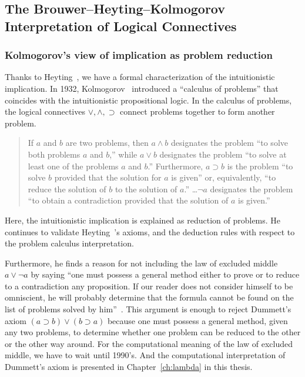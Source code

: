 \subsection{The Brouwer--Heyting--Kolmogorov Interpretation of Logical Connectives}

\subsubsection{Kolmogorov's view of implication as problem reduction}

Thanks to Heyting~\cite{heyting1930}, we have a formal
characterization of the intuitionistic implication.
In 1932, Kolmogorov~\cite{kolmogorov1932} introduced a ``calculus of problems''
that coincides with the intuitionistic propositional logic.
In the calculus of problems, the logical connectives $\vee, \wedge,
\supset$ connect problems together to form another problem.
 \begin{quote}
  If $a$ and $b$ are two problems, then $a\land b$ designates the
  problem ``to solve both problems $a$ and $b$,'' while $a\lor b$
  designates the problem ``to solve at least one of the problems $a$ and
  $b$.''  Furthermore, $a\supset b$ is the problem ``to solve $b$
  provided that the solution for $a$ is given'' or, equivalently, ``to
  reduce the solution of $b$ to the solution of
  $a$.''  \ldots $\neg a$ designates the problem ``to obtain a
  contradiction provided that the solution of $a$ is
  given.''~\cite[p.~329]{kolmogorov1932}
 \end{quote}
 Here, the intuitionistic implication
 is explained as reduction of problems.
 He continues to validate Heyting~\cite{heyting1930}'s axioms, and the
 deduction rules with respect to the problem calculus interpretation.

 Furthermore, he finds a reason for not including the law of excluded
 middle $a\lor \neg a$ by saying ``one must possess a general method
 either to prove or to reduce to a contradiction any proposition.  If
 our reader does not consider himself to be omniscient, he will probably
 determine that the formula cannot be found on the list of problems
 solved by him''~\cite{kolmogorov1932}.
 This argument is enough to reject Dummett's axiom $(a\supset b)\lor
 (b\supset a)$ because one must possess a general method, given any two
 problems, to
 determine whether
 one problem can be reduced to the other or the other way around.
 For the computational meaning of the law of excluded middle, we have to
 wait until 1990's.
 And the computational interpretation of Dummett's axiom is
 presented in Chapter~\ref{ch:lambda} in this thesis.

